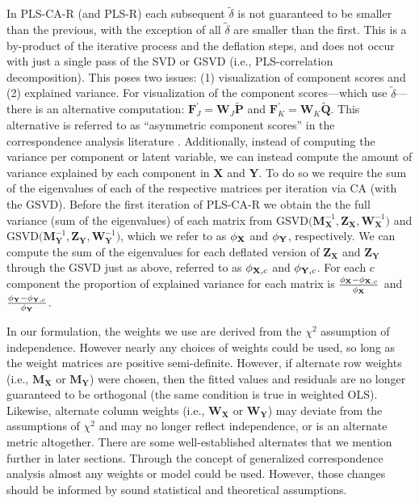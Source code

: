 \documentclass[12pt]{article}
\begin{document}
In PLS-CA-R (and PLS-R) each subsequent \(\widetilde{\delta}\) is not
guaranteed to be smaller than the previous, with the exception of all
\(\widetilde \delta\) are smaller than the first. This is a by-product
of the iterative process and the deflation steps, and does not occur
with just a single pass of the SVD or GSVD (i.e., PLS-correlation
decomposition). This poses two issues: (1) visualization of component
scores and (2) explained variance. For visualization of the component
scores---which use \(\widetilde \delta\)---there is an alternative
computation:
\({\mathbf F}^{'}_{J} = {\mathbf W}_{J}\widetilde{\mathbf P}\) and
\({\mathbf F}^{'}_{K} = {\mathbf W}_{K}\widetilde{\mathbf Q}\). This
alternative is referred to as ``asymmetric component scores'' in the
correspondence analysis literature
\citep{abdi2014correspondence, greenacre1993biplots}. Additionally,
instead of computing the variance per component or latent variable, we
can instead compute the amount of variance explained by each component
in \(\mathbf X\) and \(\mathbf Y\). To do so we require the sum of the
eigenvalues of each of the respective matrices per iteration via CA
(with the GSVD). Before the first iteration of PLS-CA-R we obtain the
the full variance (sum of the eigenvalues) of each matrix from
\(\mathrm{GSVD(} {\mathbf M}^{-1}_{\mathbf X}, {\mathbf Z}_{\mathbf X}, {\mathbf W}^{-1}_{\mathbf X} \mathrm{)}\)
and
\(\mathrm{GSVD(} {\mathbf M}^{-1}_{\mathbf Y}, {\mathbf Z}_{\mathbf Y}, {\mathbf W}^{-1}_{\mathbf Y} \mathrm{)}\),
which we refer to as \({\phi}_{\bf X}\) and \({\phi}_{\bf Y}\),
respectively. We can compute the sum of the eigenvalues for each
deflated version of \({\mathbf Z}_{\mathbf X}\) and
\({\mathbf Z}_{\mathbf Y}\) through the GSVD just as above, referred to
as \({\phi}_{{\bf X},c}\) and \({\phi}_{{\bf Y},c}\). For each \(c\)
component the proportion of explained variance for each matrix is
\(\frac{{\phi}_{\bf X} - {\phi}_{{\bf X},c}}{{\phi}_{\bf X}}\) and
\(\frac{{\phi}_{\bf Y} - {\phi}_{{\bf Y},c}}{{\phi}_{\bf Y}}\).

In our formulation, the weights we use are derived from the \(\chi^2\)
assumption of independence. However nearly any choices of weights could
be used, so long as the weight matrices are positive semi-definite.
However, if alternate row weights (i.e., \({\mathbf M}_{\mathbf X}\) or
\({\mathbf M}_{\mathbf Y}\)) were chosen, then the fitted values and
residuals are no longer guaranteed to be orthogonal (the same condition
is true in weighted OLS). Likewise, alternate column weights (i.e.,
\({\mathbf W}_{\mathbf X}\) or \({\mathbf W}_{\mathbf Y}\)) may deviate
from the assumptions of \(\chi^2\) and may no longer reflect
independence, or is an alternate metric altogether. There are some
well-established alternates that we mention further in later sections.
Through the concept of generalized correspondence analysis
\citep{escofier1983analyse, escofier1984analyse} almost any weights or
model could be used. However, those changes should be informed by sound
statistical and theoretical assumptions.
\end{document}
